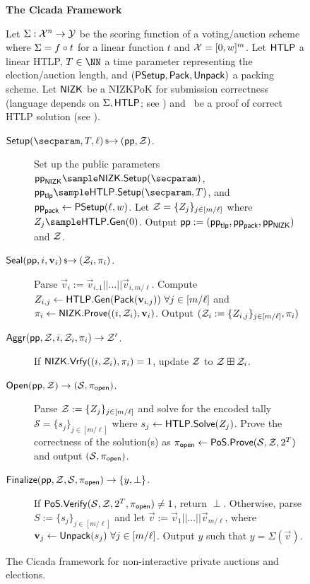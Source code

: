 \begin{figure*}[t!]
\begin{mdframed}
\begin{center}
    \textbf{The Cicada Framework}
\end{center}
Let $\Sigma: \mathcal{X}^n \rightarrow \mathcal{Y}$ be the scoring function of a voting/auction scheme
where $\Sigma = f \circ t$ for a linear function $t$ and
$\mathcal{X} = [0,w]^m$. 
Let $\mathsf{HTLP}$ a linear HTLP, $\Ttime \in \NN$ a time parameter representing the election/auction length, and $(\mathsf{PSetup}, \mathsf{Pack}, \mathsf{Unpack})$ a packing scheme.
Let $\mathsf{NIZK}$ be a NIZKPoK for 
submission correctness (language depends on $\Sigma, \mathsf{HTLP}$; see )
and \pos\ be a proof of correct HTLP solution (see ). 

\hrulefill %
\begin{description}
    \item[$\Setup(\secparam, \Ttime, \ell) \randout (\pparam, \Z)$.] 
    Set up the public parameters $\pparam_{\NIZK} \sample \NIZK.\Setup(\secparam)$, $\pparam_{\sf tlp} \sample \htlp.\Setup(\secparam, \Ttime)$, and $\mathsf{pp}_{\sf pack} \gets \mathsf{PSetup}(\ell, w)$. 
    Let $\mathcal{Z} = \{Z_j\}_{j \in [m/\ell]}$ where $Z_j \sample \htlp.{\sf Gen}(0)$. Output $\mathsf{pp} := (\mathsf{pp}_{\sf tlp}, \mathsf{pp}_{\sf pack}, \mathsf{pp}_{\mathsf{NIZK}})$ and $\mathcal{Z}$.
    \item[$\mathsf{Seal}(\mathsf{pp},i, \mathbf{v}_i) \,{\mbox{\scriptsize${\$}$\normalsize}\!\!\to}\hskip2.3pt (\mathcal{Z}_i, \pi_i)$.] Parse $\vec{v}_i := \vec{v}_{i,1} || \dots || \vec{v}_{i,m/\ell}$. Compute $Z_{i,j} \gets \mathsf{HTLP}.{\sf Gen}(\mathsf{Pack}(\mathbf{v}_{i,j}))~\forall j \in [m/\ell]$ and $\pi_i \gets \mathsf{NIZK}.\mathsf{Prove}((i, \mathcal{Z}_i), \mathbf{v}_i)$.
    Output $(\mathcal{Z}_i := \{Z_{i,j}\}_{j \in [m/\ell]}, \pi_i)$ 
    \item[$\mathsf{Aggr}(\mathsf{pp},\mathcal{Z},i,\mathcal{Z}_i,\pi_i) \rightarrow \mathcal{Z}'$.] If $\mathsf{NIZK}.\mathsf{Vrfy}((i, \mathcal{Z}_i), \pi_i) = 1$, update $\mathcal{Z}$ to $\mathcal{Z} \boxplus \mathcal{Z}_i$. %
    \item[$\mathsf{Open}(\mathsf{pp},\mathcal{Z}) \rightarrow (\mathcal{S}, \pi_{\sf open})$.] Parse $\mathcal{Z} := \{Z_j\}_{j \in [m/\ell]}$ and solve for the encoded tally $\mathcal{S} = \{s_j\}_{j \in [m/\ell]}$ where $s_j \gets \mathsf{HTLP}.{\sf Solve}(Z_j)$. Prove the correctness of the solution(s) as $\pi_{\sf open} \gets {\sf PoS}.{\sf Prove}(\mathcal{S}, \mathcal{Z}, 2^{T})$ and output $(\mathcal{S}, \pi_{\sf open})$.
    \item[$\mathsf{Finalize}(\mathsf{pp}, \mathcal{Z}, \mathcal{S}, \pi_{\sf open}) \rightarrow \{y,\perp\}$.] If ${\sf PoS}.{\sf Verify}(\mathcal{S}, \mathcal{Z}, 2^{T}, \pi_{\sf open}) \neq 1$, return $\perp$. Otherwise, parse $S := \{s_j\}_{j \in [m/\ell]}$ and let $\Vec{v} := \vec{v}_1 || \dots || \vec{v}_{m/\ell}$, where $\mathbf{v}_j \gets \mathsf{Unpack}(s_j)~\forall j \in [m/\ell]$. Output 
    $y$ such that $y = \Sigma(\vec{v})$.
\end{description}
\end{mdframed}
\caption{The Cicada framework for non-interactive private auctions and elections.}
\label{fig:cicada}
\end{figure*}